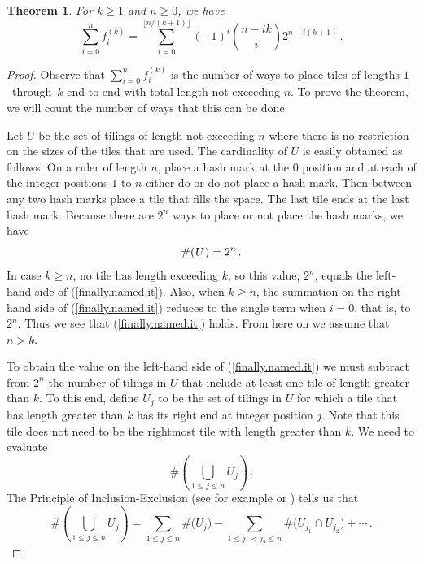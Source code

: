 \documentclass[11pt,reqno]{amsart}
\theoremstyle{plain}
\numberwithin{equation}{section}
\newtheorem{theorem}[thm]{Theorem}
\begin{document}
\begin{theorem}
For $k\geq 1$ and $n\geq 0$, we have
\begin{equation}\label{finally.named.it}
\sum_{i=0}^{n}	f_{i}^{(k)}= \sum_{i=0}^{\lfloor n/(k+1) \rfloor} (-1)^{i} \binom{n-ik}{i}2^{n-i(k+1)} 
\,.
\end{equation}
\end{theorem}

\begin{proof}  Observe that 
$ \sum_{i=0}^{n}	f_{i}^{(k)}$ is the number of ways to place tiles of lengths 
\mbox{$1$ through  $k$} end-to-end with total length not exceeding $n$.
To prove the theorem, we will count the number of ways that this can be done.

%
Let $U$ be the set of tilings of length not exceeding $n$
where there is no restriction on the sizes of the tiles that are used. 
The cardinality of $U$ is easily obtained as follows:
On a ruler of length $n$, place a hash mark at the $0$ position
and at each of the integer positions $1$ to $n$ either do or do not
place a hash mark.  Then between any two  hash marks place a tile that fills the space.
The last tile  ends at the last hash mark.  Because there are $2^n$ ways to place or not place 
the hash marks,  we have
\[
\#(\kern0.05em U\kern0.05em ) = 2^n
\,.
\]
In case $k\geq n$, no tile has length exceeding $k$, so
this value, $2^n$, equals the left-hand side of (\ref{finally.named.it}).
Also, when $k\geq n$,
the summation on the right-hand side of  (\ref{finally.named.it})  reduces to the
single term when $i=0$, that is, to $2^n$. Thus we see that (\ref{finally.named.it})  holds.
From here on we assume that $n>k$.

\medskip
To obtain the value on the  
left-hand side of (\ref{finally.named.it}) we must subtract from $2^n$ the
number of tilings  in $U$  that include at least
one tile of length greater than  $k$. To this end,
define $U_j$ to be the set of tilings in $U$ 
for which a  tile  that has  length greater than  $k$
has its right end at  integer position $j$. Note that this tile does 
not need to be the rightmost tile with length greater than $k$.
We need to evaluate
\[
\#\left( \bigcup_{1 \leq j\leq n} U_j \right)
\,.
\]
The Principle of Inclusion-Exclusion
(see for example  \cite{nelson2020brief} or \cite{stanley2012enumerative}) 
tells us that
\begin{equation}\label{value.to.subtract2}
\# \left( \bigcup_{1\leq j\leq n} U_j \right)
=
\sum_{1\leq j\leq n} \#  \Big(U_j\Big)
-
\sum_{1\leq j_1<j_2\leq n} \# \Big( U_{j_1}\cap U_{j_2} \Big) 
+
\cdots
\,.
\end{equation}


\end{proof}
\end{document}
